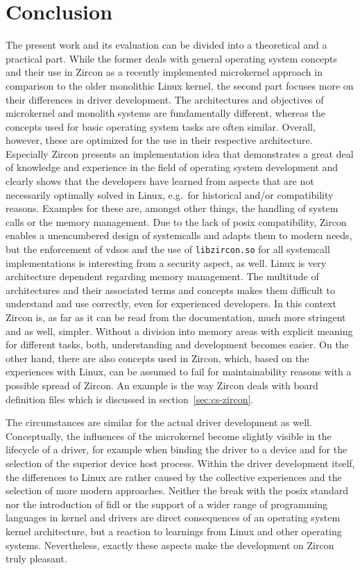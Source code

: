 
\chapter{Conclusion}\label{ch:conclusion}
The present work and its evaluation can be divided into a theoretical and a practical part.
While the former deals with general operating system concepts and their use in Zircon as a recently implemented microkernel approach in comparison to the older monolithic Linux kernel, the second part focuses more on their differences in driver development.
The architectures and objectives of microkernel and monolith systems are fundamentally different, whereas the concepts used for basic operating system tasks are often similar.
Overall, however, these are optimized for the use in their respective architecture.
Especially Zircon presents an implementation idea that demonstrates a great deal of knowledge and experience in the field of operating system development and clearly shows that the developers have learned from aspects that are not necessarily optimally solved in Linux, e.g.\ for historical and/or compatibility reasons.
Examples for these are, amongst other things, the handling of system calls or the memory management.
Due to the lack of \ac{posix} compatibility, Zircon enables a unencumbered design of systemcalls and adapts them to modern needs, but the enforcement of \acp{vdso} and the use of \texttt{libzircon.so} for all systemcall implementations is interesting from a security aspect, as well.
Linux is very architecture dependent regarding memory management.
The multitude of architectures and their associated terms and concepts makes them difficult to understand and use correctly, even for experienced developers.
In this context Zircon is, as far as it can be read from the documentation, much more stringent and as well, simpler.
Without a division into memory areas with explicit meaning for different tasks, both, understanding and development becomes easier.
On the other hand, there are also concepts used in Zircon, which, based on the experiences with Linux, can be assumed to fail for maintainability reasons with a possible spread of Zircon.
An example is the way Zircon deals with board definition files which is discussed in section~\ref{sec:cs-zircon}.

The circumstances are similar for the actual driver development as well.
Conceptually, the influences of the microkernel become slightly visible in the lifecycle of a driver, for example when binding the driver to a device and for the selection of the superior device host process.
Within the driver development itself, the differences to Linux are rather caused by the collective experiences and the selection of more modern approaches.
Neither the break with the \ac{posix} standard nor the introduction of \ac{fidl} or the support of a wider range of programming languages in kernel and drivers are direct consequences of an operating system kernel architecture, but a reaction to learnings from Linux and other operating systems.
Nevertheless, exactly these aspects make the development on Zircon truly pleasant.

